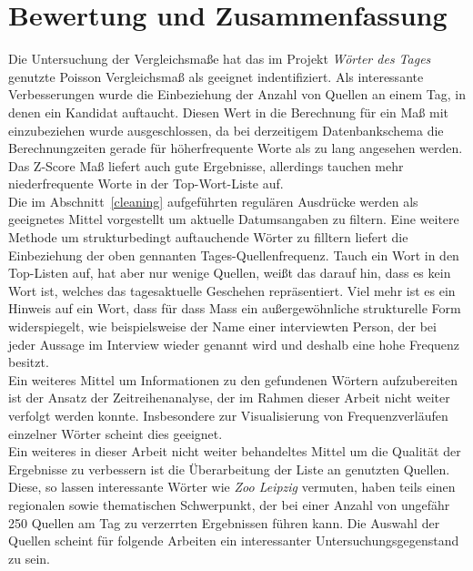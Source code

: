 \chapter{Bewertung und Zusammenfassung}\label{schluss}
Die Untersuchung der Vergleichsmaße hat das im Projekt \emph{Wörter des Tages} genutzte Poisson Vergleichsmaß als geeignet indentifiziert. Als interessante Verbesserungen wurde die Einbeziehung der Anzahl von Quellen an einem Tag, in denen ein Kandidat auftaucht. Diesen Wert in die Berechnung für ein Maß mit einzubeziehen wurde ausgeschlossen, da bei derzeitigem Datenbankschema die Berechnungzeiten gerade für höherfrequente Worte als zu lang angesehen werden. Das Z-Score Maß liefert auch gute Ergebnisse, allerdings tauchen mehr niederfrequente Worte in der Top-Wort-Liste auf.\\
Die im Abschnitt~\ref{cleaning} aufgeführten regulären Ausdrücke werden als geeignetes Mittel vorgestellt um aktuelle Datumsangaben zu filtern. Eine weitere Methode um strukturbedingt auftauchende Wörter zu filltern liefert die Einbeziehung der oben gennanten Tages-Quellenfrequenz. Tauch ein Wort in den Top-Listen auf, hat aber nur wenige Quellen, weißt das darauf hin, dass es kein Wort ist, welches das tagesaktuelle Geschehen repräsentiert. Viel mehr ist es ein Hinweis auf ein Wort, dass für dass Mass ein außergewöhnliche strukturelle Form widerspiegelt, wie beispielsweise der Name einer interviewten Person, der bei jeder Aussage im Interview wieder genannt wird und deshalb eine hohe Frequenz besitzt.\\
Ein weiteres Mittel um Informationen zu den gefundenen Wörtern aufzubereiten ist der Ansatz der Zeitreihenanalyse, der im Rahmen dieser Arbeit nicht weiter verfolgt werden konnte. Insbesondere zur Visualisierung von Frequenzverläufen einzelner Wörter scheint dies geeignet.\\
Ein weiteres in dieser Arbeit nicht weiter behandeltes Mittel um die Qualität der Ergebnisse zu verbessern ist die Überarbeitung der Liste an genutzten Quellen. Diese, so lassen interessante Wörter wie \emph{Zoo Leipzig} vermuten, haben teils einen regionalen sowie thematischen Schwerpunkt, der bei einer Anzahl von ungefähr 250 Quellen am Tag zu verzerrten Ergebnissen führen kann. Die Auswahl der Quellen scheint für folgende Arbeiten ein interessanter Untersuchungsgegenstand zu sein.



 


